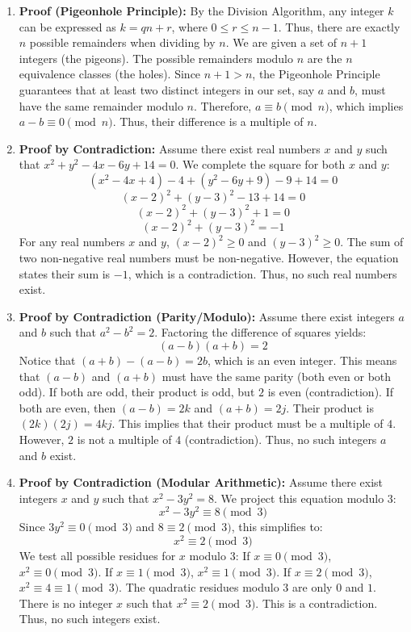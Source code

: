 \documentclass[11pt]{article}
\begin{document}
\begin{enumerate}
    \item \textbf{Proof (Pigeonhole Principle):} By the Division Algorithm, any integer $k$ can be expressed as $k = qn + r$, where $0 \le r \le n-1$. Thus, there are exactly $n$ possible remainders when dividing by $n$.
    We are given a set of $n+1$ integers (the pigeons). The possible remainders modulo $n$ are the $n$ equivalence classes (the holes). 
    Since $n+1 > n$, the Pigeonhole Principle guarantees that at least two distinct integers in our set, say $a$ and $b$, must have the same remainder modulo $n$. 
    Therefore, $a \equiv b \pmod n$, which implies $a - b \equiv 0 \pmod n$. Thus, their difference is a multiple of $n$. \qedhere

    \item \textbf{Proof by Contradiction:} Assume there exist real numbers $x$ and $y$ such that $x^2 + y^2 - 4x - 6y + 14 = 0$. We complete the square for both $x$ and $y$:
    \[ (x^2 - 4x + 4) - 4 + (y^2 - 6y + 9) - 9 + 14 = 0 \]
    \[ (x - 2)^2 + (y - 3)^2 - 13 + 14 = 0 \]
    \[ (x - 2)^2 + (y - 3)^2 + 1 = 0 \]
    \[ (x - 2)^2 + (y - 3)^2 = -1 \]
    For any real numbers $x$ and $y$, $(x - 2)^2 \ge 0$ and $(y - 3)^2 \ge 0$. The sum of two non-negative real numbers must be non-negative. However, the equation states their sum is $-1$, which is a contradiction. Thus, no such real numbers exist. \qedhere

    \item \textbf{Proof by Contradiction (Parity/Modulo):} Assume there exist integers $a$ and $b$ such that $a^2 - b^2 = 2$. Factoring the difference of squares yields:
    \[ (a - b)(a + b) = 2 \]
    Notice that $(a + b) - (a - b) = 2b$, which is an even integer. This means that $(a - b)$ and $(a + b)$ must have the same parity (both even or both odd). 
    If both are odd, their product is odd, but $2$ is even (contradiction).
    If both are even, then $(a - b) = 2k$ and $(a + b) = 2j$. Their product is $(2k)(2j) = 4kj$. This implies that their product must be a multiple of $4$. However, $2$ is not a multiple of $4$ (contradiction).
    Thus, no such integers $a$ and $b$ exist. \qedhere

    \item \textbf{Proof by Contradiction (Modular Arithmetic):} Assume there exist integers $x$ and $y$ such that $x^2 - 3y^2 = 8$. We project this equation modulo $3$:
    \[ x^2 - 3y^2 \equiv 8 \pmod 3 \]
    Since $3y^2 \equiv 0 \pmod 3$ and $8 \equiv 2 \pmod 3$, this simplifies to:
    \[ x^2 \equiv 2 \pmod 3 \]
    We test all possible residues for $x$ modulo $3$:
    If $x \equiv 0 \pmod 3$, $x^2 \equiv 0 \pmod 3$.
    If $x \equiv 1 \pmod 3$, $x^2 \equiv 1 \pmod 3$.
    If $x \equiv 2 \pmod 3$, $x^2 \equiv 4 \equiv 1 \pmod 3$.
    The quadratic residues modulo $3$ are only $0$ and $1$. There is no integer $x$ such that $x^2 \equiv 2 \pmod 3$. This is a contradiction. Thus, no such integers exist. \qedhere


\end{enumerate}
\end{document}
